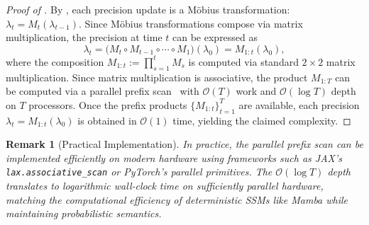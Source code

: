 \documentclass{article}
\newtheorem*{remark}{Remark}
\begin{document}
\CorParallelScan*

\begin{mdframed}
\begin{proof}[Proof of ]
By , each precision update is a M\"{o}bius transformation:
$\lambda_t = M_t(\lambda_{t-1})$. Since M\"{o}bius transformations compose via
matrix multiplication, the precision at time $t$ can be expressed as
\[
\lambda_t = \bigl(M_t \circ M_{t-1} \circ \cdots \circ M_1\bigr)(\lambda_0)
= M_{1:t}(\lambda_0),
\]
where the composition $M_{1:t} := \prod_{s=1}^t M_s$ is computed via
standard $2\times 2$ matrix multiplication. Since matrix multiplication is
associative, the product $M_{1:T}$ can be computed via a parallel prefix
scan~\citep{blelloch1990prefix} with $\mathcal{O}(T)$ work and $\mathcal{O}(\log T)$ depth on
$T$ processors. Once the prefix products $\{M_{1:t}\}_{t=1}^T$ are available,
each precision $\lambda_t = M_{1:t}(\lambda_0)$ is obtained in $\mathcal{O}(1)$
time, yielding the claimed complexity.
\end{proof}
\end{mdframed}

\begin{remark}[Practical Implementation]
In practice, the parallel prefix scan can be implemented efficiently on modern hardware
using frameworks such as JAX's \texttt{lax.associative\_scan} or PyTorch's parallel
primitives. The $\mathcal{O}(\log T)$ depth translates to logarithmic wall-clock time on
sufficiently parallel hardware, matching the computational efficiency of deterministic
SSMs like Mamba while maintaining probabilistic semantics.
\end{remark}

\newpage
\end{document}

